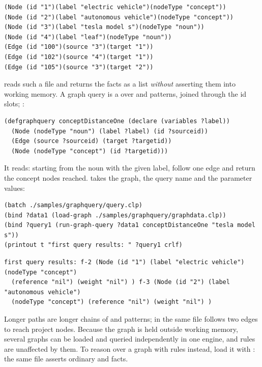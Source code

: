 \begin{lstlisting}
(Node (id "1")(label "electric vehicle")(nodeType "concept"))
(Node (id "2")(label "autonomous vehicle")(nodeType "concept"))
(Node (id "3")(label "tesla model s")(nodeType "noun"))
(Node (id "4")(label "leaf")(nodeType "noun"))
(Edge (id "100")(source "3")(target "1"))
(Edge (id "102")(source "4")(target "1"))
(Edge (id "105")(source "3")(target "2"))
\end{lstlisting}

 reads such a file and returns the facts as a list
\emph{without} asserting them into working memory. A graph query is a
 over  and  patterns, joined through the
id slots; :

\begin{lstlisting}
(defgraphquery conceptDistanceOne (declare (variables ?label))
  (Node (nodeType "noun") (label ?label) (id ?sourceid))
  (Edge (source ?sourceid) (target ?targetid))
  (Node (nodeType "concept") (id ?targetid)))
\end{lstlisting}

It reads: starting from the noun with the given label, follow one edge
and return the concept nodes reached.  takes the
graph, the query name and the parameter values:

\begin{lstlisting}
(batch ./samples/graphquery/query.clp)
(bind ?data1 (load-graph ./samples/graphquery/graphdata.clp))
(bind ?query1 (run-graph-query ?data1 conceptDistanceOne "tesla model s"))
(printout t "first query results: " ?query1 crlf)
\end{lstlisting}

\begin{lstlisting}[style=shell]
first query results: f-2 (Node (id "1") (label "electric vehicle") (nodeType "concept")
  (reference "nil") (weight "nil") ) f-3 (Node (id "2") (label "autonomous vehicle")
  (nodeType "concept") (reference "nil") (weight "nil") )
\end{lstlisting}

Longer paths are longer chains of  and  patterns;
 in the same file follows two edges to reach
project nodes. Because the graph is held outside working memory, several
graphs can be loaded and queried independently in one engine, and rules
are unaffected by them. To reason over a graph with rules instead, load
it with : the same file asserts ordinary  and
 facts.
